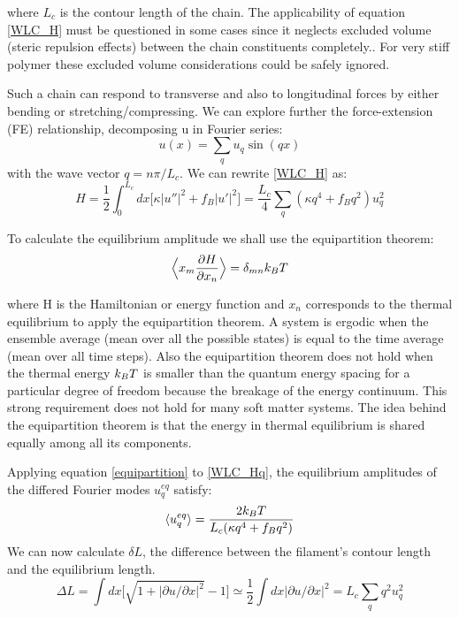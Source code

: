 where $L_c$ is the contour length of the chain.
The applicability of equation \ref{WLC_H} must be questioned in some cases since
it neglects excluded volume (steric repulsion effects) between the
chain constituents completely.\citet{hsu_breakdown_2011}. For very stiff polymer
these excluded volume considerations could be safely ignored.

Such a chain can respond to transverse and also to longitudinal forces by either
bending or stretching/compressing. We can explore further the force-extension
(FE) relationship, decomposing u in Fourier series:
\begin{equation}\label{WLC_ufourier}
u(x)=\sum_q u_q \sin(qx)
\end{equation}
with the wave vector $q=n\pi/L_c$. We can rewrite \ref{WLC_H} as:
\begin{equation}\label{WLC_Hq}
H=\frac{1}{2}\int_0^{L_c} dx\Big[\kappa|u''|^2 + f_B|u'|^2\Big] =
\frac{L_c}{4}\sum_q (\kappa q^4 + f_Bq^2)u_q^2
\end{equation}

To calculate the equilibrium amplitude we shall use the equipartition theorem:
\begin{equation}\label{equipartition}
\Big\langle x_m\frac{\partial H}{\partial x_n} \Big\rangle= \delta_{mn}k_B{}T
\end{equation}

where H is the Hamiltonian or energy function and $x_n$ corresponds to the
thermal equilibrium to apply the equipartition theorem. A system is ergodic when
the ensemble average (mean over all the possible states) is equal to the time average (mean over all time
steps). Also the equipartition theorem does not hold when the
thermal energy $k_B{}T$ is smaller than the quantum energy spacing for a
particular degree of freedom because the breakage of the energy continuum. This
strong requirement does not hold for many soft matter systems. The idea behind
the equipartition theorem is that the energy in thermal equilibrium is shared
equally among all its components.

Applying equation \ref{equipartition} to \ref{WLC_Hq}, the equilibrium
amplitudes of the differed Fourier modes $u_q^{eq} $ satisfy:
\begin{equation}\label{equipartition_uq}
\langle u_q^{eq}\rangle=\frac{2k_B{}T}{L_c(\kappa{}q^4+f_Bq^2)}
\end{equation}
We can now calculate $\delta L$, the difference between the filament's contour
length and the equilibrium length.
\begin{equation}\label{deltaL}
\Delta L= \int dx \Big[ \sqrt{1+|\partial u/\partial x|^2} -1\Big]\simeq
\frac{1}{2} \int dx |\partial u/\partial x|^2 = L_c \sum_q q^2 u_q^2
\end{equation}

